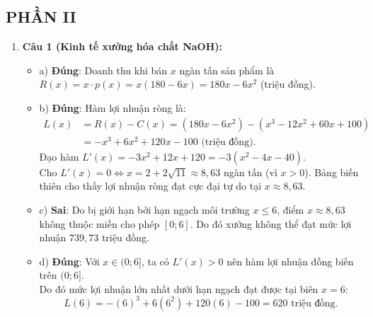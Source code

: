 \documentclass[12pt,a4paper]{article}
\begin{document}
\subsection*{PHẦN II}
\begin{enumerate}[label=\textbf{Câu \arabic*:}, leftmargin=*]
\item \textbf{Câu 1 (Kinh tế xưởng hóa chất NaOH):}
\begin{itemize}
    \item a) \textbf{Đúng}: Doanh thu khi bán $x$ ngàn tấn sản phẩm là $R(x) = x \cdot p(x) = x(180 - 6x) = 180x - 6x^2$ (triệu đồng).
    \item b) \textbf{Đúng}: Hàm lợi nhuận ròng là:
    $$\begin{aligned}
    L(x) &= R(x) - C(x) = (180x - 6x^2) - (x^3 - 12x^2 + 60x + 100)\\
    &= -x^3 + 6x^2 + 120x - 100\text{ (triệu đồng)}.
    \end{aligned}$$
    Đạo hàm $L'(x) = -3x^2 + 12x + 120 = -3(x^2 - 4x - 40)$.\\
    Cho $L'(x) = 0 \iff x = 2 + 2\sqrt{11} \approx 8{,}63$ ngàn tấn (vì $x > 0$). Bảng biến thiên cho thấy lợi nhuận ròng đạt cực đại tự do tại $x \approx 8{,}63$.
    \item c) \textbf{Sai}: Do bị giới hạn bởi hạn ngạch môi trường $x \le 6$, điểm $x \approx 8{,}63$ không thuộc miền cho phép $[0; 6]$. Do đó xưởng không thể đạt mức lợi nhuận $739{,}73$ triệu đồng.
    \item d) \textbf{Đúng}: Với $x \in (0; 6]$, ta có $L'(x) > 0$ nên hàm lợi nhuận đồng biến trên $(0; 6]$.\\
    Do đó mức lợi nhuận lớn nhất dưới hạn ngạch đạt được tại biên $x = 6$:
    $$L(6) = -(6)^3 + 6(6^2) + 120(6) - 100 = 620\text{ triệu đồng}.$$
\end{itemize}


\end{enumerate}
\end{document}
